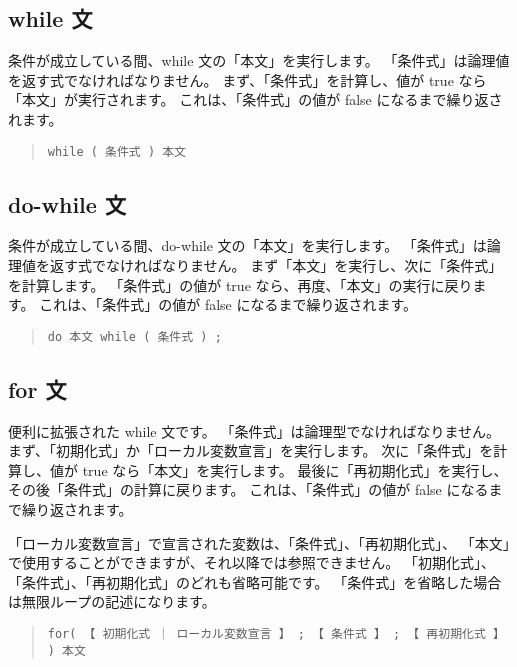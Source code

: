 \subsection{while 文}

条件が成立している間、while 文の「本文」を実行します。
「条件式」は論理値を返す式でなければなりません。
まず、「条件式」を計算し、値が true なら「本文」が実行されます。
これは、「条件式」の値が false になるまで繰り返されます。

\begin{quote}
\begin{verbatim}
while ( 条件式 ) 本文
\end{verbatim}
\end{quote}

\subsection{do-while 文}

条件が成立している間、do-while 文の「本文」を実行します。
「条件式」は論理値を返す式でなければなりません。
まず「本文」を実行し、次に「条件式」を計算します。
「条件式」の値が true なら、再度、「本文」の実行に戻ります。
これは、「条件式」の値が false になるまで繰り返されます。

\begin{quote}
\begin{verbatim}
do 本文 while ( 条件式 ) ;
\end{verbatim}
\end{quote}

\subsection{for 文}

便利に拡張された while 文です。
「条件式」は論理型でなければなりません。
まず、「初期化式」か「ローカル変数宣言」を実行します。
次に「条件式」を計算し、値が true なら「本文」を実行します。
最後に「再初期化式」を実行し、その後「条件式」の計算に戻ります。
これは、「条件式」の値が false になるまで繰り返されます。

「ローカル変数宣言」で宣言された変数は、「条件式」、「再初期化式」、
「本文」で使用することができますが、それ以降では参照できません。
「初期化式」、「条件式」、「再初期化式」のどれも省略可能です。
「条件式」を省略した場合は無限ループの記述になります。

\begin{quote}
\begin{verbatim}
for( 【 初期化式 ｜ ローカル変数宣言 】 ; 【 条件式 】 ; 【 再初期化式 】 ) 本文
\end{verbatim}
\end{quote}

